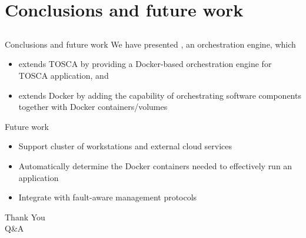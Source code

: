 \documentclass{beamer}
\begin{document}
\section{Conclusions and future work}\subsection*{}
  \begin{frame}{Conclusions and future work}%
    We have presented \dt, an orchestration engine, which
    \begin{itemize}
      \item extends TOSCA by providing a Docker-based orchestration engine for TOSCA application, and
      \item extends Docker by adding the capability of orchestrating software components together with Docker containers/volumes\pause
    \end{itemize}
    \medskip
    {\large Future work}
    \begin{itemize}
      \item Support cluster of workstations and external cloud services\pause
      \item Automatically determine the Docker containers needed to effectively run an application\pause
      \item Integrate \dt with fault-aware management protocols
    \end{itemize}
  \end{frame}

  \begin{frame}
    \centering
    \Huge Thank You \\
    \bigskip
    \LARGE Q\&A
  \end{frame}
\end{document}
